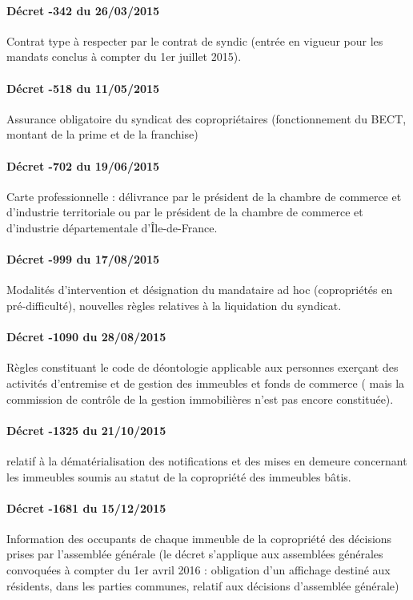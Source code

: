 			\paragraph{Décret -342 du 26/03/2015} Contrat type à respecter par le contrat de syndic (entrée en vigueur pour les mandats conclus à compter du 1er juillet 2015).
			
			\paragraph{Décret -518 du 11/05/2015} Assurance obligatoire du syndicat des copropriétaires (fonctionnement du BECT, montant de la prime et de la franchise)
			
			\paragraph{Décret -702 du 19/06/2015} Carte professionnelle : délivrance par le président de la chambre de commerce et d’industrie territoriale ou par le président de la chambre de commerce et d’industrie départementale d’Île-de-France.
			
			\paragraph{Décret -999 du 17/08/2015} Modalités d’intervention et désignation du mandataire ad hoc (copropriétés en pré-difficulté), nouvelles règles relatives à la liquidation du syndicat.
			
			\paragraph{Décret -1090 du 28/08/2015} Règles constituant le code de déontologie applicable aux personnes exerçant des activités d'entremise et de gestion des immeubles et fonds de commerce ( mais la commission de contrôle de la gestion immobilières n’est pas encore constituée).
			
			\paragraph{Décret -1325 du 21/10/2015} relatif à la dématérialisation des notifications et des mises en demeure concernant les immeubles soumis au statut de la copropriété des immeubles bâtis.
			
			\paragraph{Décret -1681 du 15/12/2015} Information des occupants de chaque immeuble de la copropriété des décisions prises par l’assemblée générale (le décret s'applique aux assemblées générales convoquées à compter du 1er avril 2016 : obligation d’un affichage destiné aux résidents, dans les parties communes, relatif aux décisions d’assemblée générale)
			
